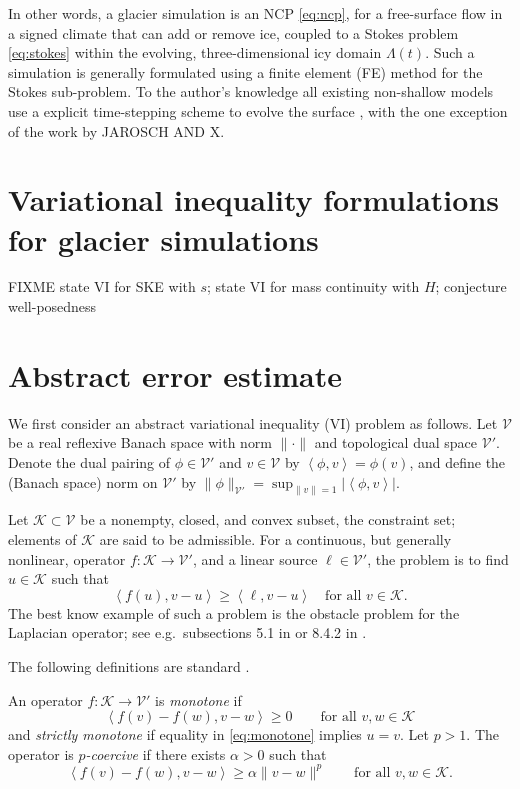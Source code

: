 \documentclass[hidelinks,onefignum,onetabnum,final]{siamart220329}  %
\newcommand{\cK}{\mathcal{K}}
\newcommand{\cV}{\mathcal{V}}
\newcommand{\ip}[2]{\left<#1,#2\right>}
\begin{document}
In other words, a glacier simulation is an NCP \eqref{eq:ncp}, for a free-surface flow in a signed climate that can add or remove ice, coupled to a Stokes problem \eqref{eq:stokes} within the evolving, three-dimensional icy domain $\Lambda(t)$.  Such a simulation is generally formulated using a finite element (FE) method for the Stokes sub-problem.  To the author's knowledge all existing non-shallow models use a explicit time-stepping scheme to evolve the surface \cite[for example]{Jouvetetal2008}, with the one exception of the work by JAROSCH AND X.  


\section{Variational inequality formulations for glacier simulations} \label{sec:viformulations}

FIXME state VI for SKE with $s$; state VI for mass continuity with $H$; conjecture well-posedness


\section{Abstract error estimate} \label{sec:abstractestimate}

We first consider an abstract variational inequality (VI) \cite{KinderlehrerStampacchia1980} problem as follows.  Let $\cV$ be a real reflexive Banach space with norm $\|\cdot\|$ and topological dual space $\cV'$.  Denote the dual pairing of $\phi \in \cV'$ and $v\in\cV$ by $\ip{\phi}{v} = \phi(v)$, and define the (Banach space) norm on $\cV'$ by $\|\phi\|_{\cV'} = \sup_{\|v\|=1} |\!\ip{\phi}{v}\!|$.

Let $\cK \subset \cV$ be a nonempty, closed, and convex subset, the constraint set; elements of $\cK$ are said to be admissible.  For a continuous, but generally nonlinear, operator $f:\cK \to \cV'$, and a linear source $\ell\in \cV'$, the problem is to find $u\in \cK$ such that
\begin{equation}
\ip{f(u)}{v-u} \ge \ip{\ell}{v-u} \quad \text{for all } v\in \cK. \label{eq:vi}
\end{equation}
The best know example of such a problem is the obstacle problem for the Laplacian operator; see e.g.~subsections 5.1 in \cite{Ciarlet2002} or 8.4.2 in \cite{Evans2010}.

The following definitions are standard \cite[for example]{KinderlehrerStampacchia1980}.

\begin{definition}  An operator $f:\cK \to \cV'$ is \emph{monotone} if
\begin{equation}
\ip{f(v)-f(w)}{v-w} \ge 0 \qquad \text{for all } v,w \in \cK \label{eq:monotone}
\end{equation}
and \emph{strictly monotone} if equality in \eqref{eq:monotone} implies $u=v$.  Let $p>1$.  The operator is \emph{$p$-coercive} if there exists $\alpha>0$ such that
\begin{equation}
\ip{f(v)-f(w)}{v-w} \ge \alpha \|v-w\|^p \qquad \text{for all } v,w \in \cK. \label{eq:pcoercive}
\end{equation}
\end{definition}
\end{document}

